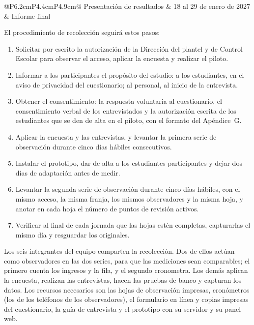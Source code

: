 \begin{table}[tbp]
\begin{tabular}{@{}P{6.2cm}P{4.4cm}P{4.9cm}@{}}
		Presentación de resultados                                            & 18 al 29 de enero de 2027                 & Informe final                                   \\
		\bottomrule
	\end{tabular}
\end{table}

El procedimiento de recolección seguirá estos pasos:
\begin{enumerate}
	\item Solicitar por escrito la autorización de la Dirección del plantel y
	      de Control Escolar para observar el acceso, aplicar la encuesta y
	      realizar el piloto.
	\item Informar a los participantes el propósito del estudio: a los
	      estudiantes, en el aviso de privacidad del cuestionario; al personal,
	      al inicio de la entrevista.
	\item Obtener el consentimiento: la respuesta voluntaria al cuestionario,
	      el consentimiento verbal de los entrevistados y la autorización escrita
	      de los estudiantes que se den de alta en el piloto, con el formato del
	      Apéndice~G.
	\item Aplicar la encuesta y las entrevistas, y levantar la primera serie de
	      observación durante cinco días hábiles consecutivos.
	\item Instalar el prototipo, dar de alta a los estudiantes participantes y
	      dejar dos días de adaptación antes de medir.
	\item Levantar la segunda serie de observación durante cinco días hábiles,
	      con el mismo acceso, la misma franja, los mismos observadores y la
	      misma hoja, y anotar en cada hoja el número de puntos de revisión
	      activos.
	\item Verificar al final de cada jornada que las hojas estén completas,
	      capturarlas el mismo día y resguardar los originales.
\end{enumerate}

Los seis integrantes del equipo comparten la recolección. Dos de ellos
actúan como observadores en las dos series, para que las mediciones sean
comparables; el primero cuenta los ingresos y la fila, y el segundo
cronometra. Los demás aplican la encuesta, realizan las entrevistas, hacen
las pruebas de banco y capturan los datos. Los recursos necesarios son las
hojas de observación impresas, cronómetros (los de los teléfonos de los
observadores), el formulario en línea y copias impresas del cuestionario,
la guía de entrevista y el prototipo con su servidor y su panel web.

